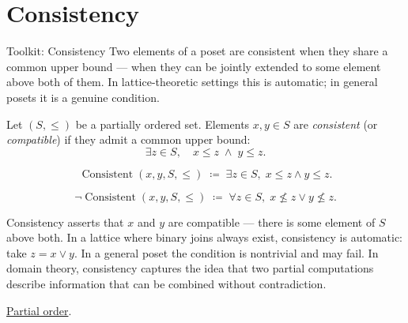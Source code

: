 
\section{Consistency}
\label{sec:consistency}

\begin{toolkitbox}{Toolkit: Consistency}
Two elements of a poset are consistent when they share a common upper
bound — when they can be jointly extended to some element above both of
them.  In lattice-theoretic settings this is automatic; in general posets
it is a genuine condition.
\end{toolkitbox}


\begin{definition}[Consistency]
\label{def:consistency}
Let $(S, \leq)$ be a partially ordered set.  Elements $x, y \in S$ are
\emph{consistent} (or \emph{compatible}) if they admit a common upper
bound:
\[
\exists z \in S, \quad x \leq z \;\land\; y \leq z.
\]
\end{definition}

\begin{remark*}
\[
\operatorname{Consistent}(x, y, S, \leq)
\;\coloneqq\;
\exists z \in S,\; x \leq z \land y \leq z.
\]
\end{remark*}

\begin{remark*}
\[
\neg\operatorname{Consistent}(x, y, S, \leq)
\;\coloneqq\;
\forall z \in S,\; x \not\leq z \lor y \not\leq z.
\]
\end{remark*}

\begin{remark*}[Interpretation]
Consistency asserts that $x$ and $y$ are compatible — there is some
element of $S$ above both.  In a lattice where binary joins always exist,
consistency is automatic: take $z = x \vee y$.  In a general poset the
condition is nontrivial and may fail.  In domain theory, consistency
captures the idea that two partial computations describe information that
can be combined without contradiction.
\end{remark*}

\begin{remark*}[Dependencies]
\hyperref[def:partial-order]{Partial order}.
\end{remark*}
